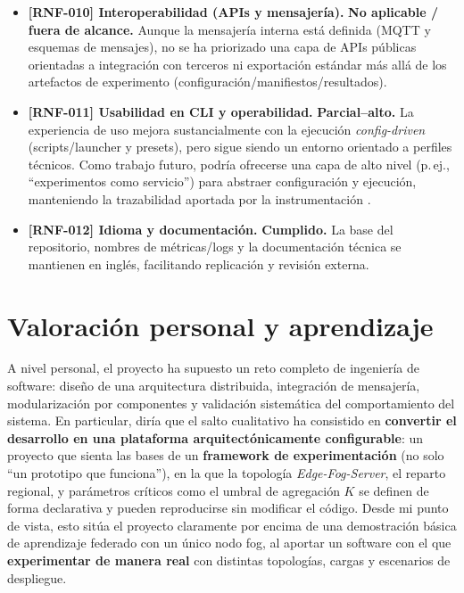 \documentclass{report}
\begin{document}
\begin{itemize}
  \item \textbf{[RNF-010] Interoperabilidad (APIs y mensajería).} \textbf{No aplicable / fuera de alcance.}  
  Aunque la mensajería interna está definida (MQTT y esquemas de mensajes), no se ha priorizado una capa de APIs públicas orientadas a integración con terceros ni exportación estándar más allá de los artefactos de experimento (configuración/manifiestos/resultados).

  \item \textbf{[RNF-011] Usabilidad en CLI y operabilidad.} \textbf{Parcial--alto.}  
  La experiencia de uso mejora sustancialmente con la ejecución \textit{config-driven} (scripts/launcher y presets), pero sigue siendo un entorno orientado a perfiles técnicos. Como trabajo futuro, podría ofrecerse una capa de alto nivel (p.\,ej., ``experimentos como servicio'') para abstraer configuración y ejecución, manteniendo la trazabilidad aportada por la instrumentación \cite{opentelemetry}.

  \item \textbf{[RNF-012] Idioma y documentación.} \textbf{Cumplido.}  
  La base del repositorio, nombres de métricas/logs y la documentación técnica se mantienen en inglés, facilitando replicación y revisión externa.

\end{itemize}

\vspace{0.35em}
\section{Valoración personal y aprendizaje}
\label{sec:valoracion_personal}

A nivel personal, el proyecto ha supuesto un reto completo de ingeniería de software: diseño de una arquitectura distribuida, integración de mensajería, modularización por componentes y validación sistemática del comportamiento del sistema. En particular, diría que el salto cualitativo ha consistido en \textbf{convertir el desarrollo en una plataforma arquitectónicamente configurable}: un proyecto que sienta las bases de un \textbf{framework de experimentación} (no solo ``un prototipo que funciona''), en la que la topología \textit{Edge-Fog-Server}, el reparto regional, y parámetros críticos como el umbral de agregación $K$ se definen de forma declarativa y pueden reproducirse sin modificar el código. Desde mi punto de vista, esto sitúa el proyecto claramente por encima de una demostración básica de aprendizaje federado con un único nodo fog, al aportar un software con el que \textbf{experimentar de manera real} con distintas topologías, cargas y escenarios de despliegue.
\end{document}
